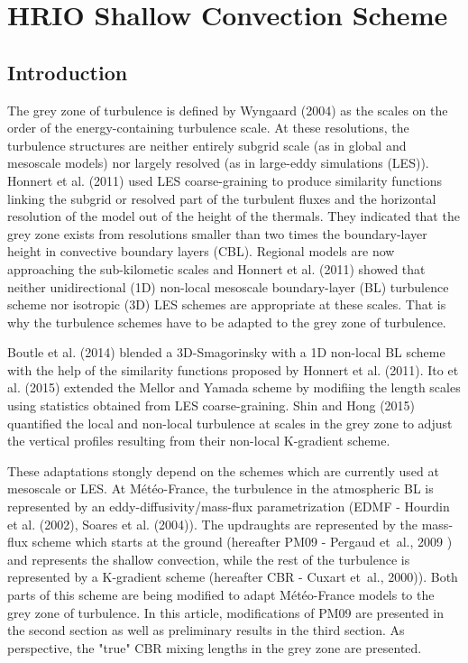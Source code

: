 \chapter{HRIO Shallow Convection Scheme}
\minitoc


\section{Introduction}

The grey zone of turbulence is defined by Wyngaard (2004) as the scales on the order of the energy-containing turbulence scale. At these resolutions, the turbulence structures are neither entirely subgrid scale (as in global and mesoscale models) nor largely resolved (as in large-eddy simulations (LES)). Honnert et al. (2011) used LES coarse-graining to produce similarity functions linking the subgrid or resolved part of the turbulent fluxes and the horizontal resolution of the model out of the height of the thermals. They indicated that the grey zone exists from resolutions smaller than two times the boundary-layer height in convective boundary layers (CBL). Regional models are now approaching the sub-kilometic scales and Honnert et al. (2011) showed that neither unidirectional (1D) non-local mesoscale boundary-layer (BL) turbulence scheme nor isotropic (3D) LES schemes are appropriate at these scales. That is why the turbulence schemes have to be adapted to the grey zone of turbulence. 

Boutle et al. (2014) blended a 3D-Smagorinsky with a 1D non-local BL scheme with the help of the similarity functions proposed by Honnert et al. (2011). Ito et al. (2015) extended the Mellor and Yamada scheme by modifiing the length scales using statistics obtained from LES coarse-graining. Shin and Hong (2015) quantified the local and non-local turbulence at scales in the grey zone to adjust the vertical profiles resulting from their non-local K-gradient scheme.  

These adaptations stongly depend on the schemes which are currently used at mesoscale or LES. At M\'et\'eo-France, the turbulence in the atmospheric BL is represented by an eddy-diffusivity/mass-flux  parametrization (EDMF - Hourdin et al. (2002), Soares et al. (2004)). The updraughts are represented by the mass-flux scheme which starts at the ground (hereafter PM09 - Pergaud et~al., 2009 ) and represents the shallow convection, while the rest of the turbulence is represented by a K-gradient scheme (hereafter CBR - Cuxart et~al., 2000)). Both parts of this scheme are being modified to adapt M\'et\'eo-France models to the grey zone of turbulence.   
In this article, modifications of PM09 are presented in the second section as well as preliminary results in the third section. As perspective, the "true" CBR mixing lengths in the grey zone are presented.

